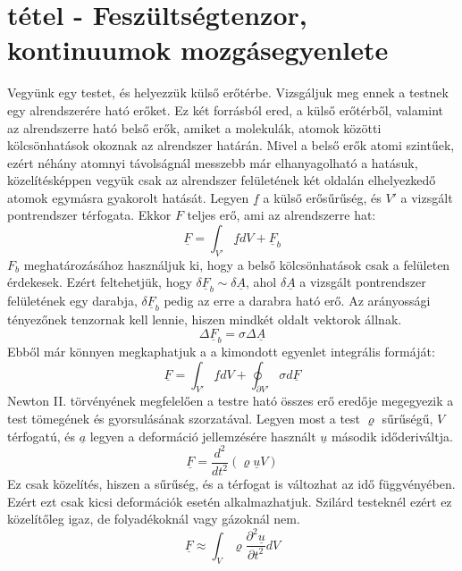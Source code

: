 \documentclass[a4paper,12pt]{article}
\begin{document}
\section{tétel - Feszültségtenzor, kontinuumok mozgásegyenlete}
Vegyünk egy testet, és helyezzük külső erőtérbe. Vizsgáljuk meg ennek a testnek egy alrendszerére ható erőket. Ez két forrásból ered, a külső erőtérből, valamint az alrendszerre ható belső erők, amiket a molekulák, atomok közötti kölcsönhatások okoznak az alrendszer határán. Mivel a belső erők atomi szintűek, ezért néhány atomnyi távolságnál messzebb már elhanyagolható a hatásuk, közelítésképpen vegyük csak az alrendszer felületének két oldalán elhelyezkedő atomok egymásra gyakorolt hatását.
Legyen $\underline{f}$ a külső erősűrűség, és $V'$ a vizsgált pontrendszer térfogata. Ekkor $F$ teljes erő, ami az alrendszerre hat:
\begin{equation}
\underline{F}=\int_{V'}\underline{f}dV+\underline{F}_b
\end{equation}
$F_b$ meghatározásához használjuk ki, hogy a belső kölcsönhatások csak a felületen érdekesek. Ezért feltehetjük, hogy $\delta \underline{F}_b \sim \delta \underline{A}$, ahol $\delta \underline{A}$ a vizsgált pontrendszer felületének egy darabja, $\delta \underline{F}_b$ pedig az erre a darabra ható erő. Az arányossági tényezőnek tenzornak kell lennie, hiszen mindkét oldalt vektorok állnak. 
\begin{equation}
\Delta\underline{F}_b=\sigma\Delta\underline{A}
\end{equation}
Ebből már könnyen megkaphatjuk a a kimondott egyenlet integrális formáját:
\begin{equation}
\underline{F}=\int_{V'}\underline{f}dV+\oint_{\partial V'}\sigma d\underline{F}
\end{equation}
Newton II. törvényének megfelelően a testre ható összes erő eredője megegyezik a test tömegének és gyorsulásának szorzatával. Legyen most a test $\varrho$ sűrűségű, $V$ térfogatú, és $\underline{a}$ legyen a deformáció jellemzésére használt $\underline{u}$ második időderiváltja.
\begin{equation}
\underline{F}=\frac{d^2}{dt^2}(\varrho\underline{u}V)
\end{equation}
Ez csak közelítés, hiszen a sűrűség, és a térfogat is változhat az idő függvényében. Ezért ezt csak kicsi deformációk esetén alkalmazhatjuk. Szilárd testeknél ezért ez közelítőleg igaz, de folyadékoknál vagy gázoknál nem.
\begin{equation}
\underline{F}\approx\int_V\varrho\frac{\partial^2\underline{u}}{\partial t^2}dV
\end{equation}
\end{document}

